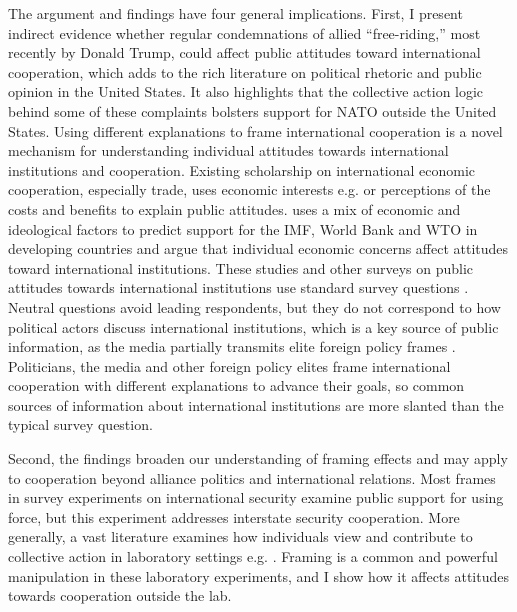 \documentclass[12pt]{article}
\begin{document}
The argument and findings have four general implications.
First, I present indirect evidence whether regular condemnations of allied ``free-riding,'' most recently by Donald Trump, could affect public attitudes toward international cooperation, which adds to the rich literature on political rhetoric and public opinion in the United States. 
It also highlights that the collective action logic behind some of these complaints bolsters support for NATO outside the United States.  
Using different explanations to frame international cooperation is a novel mechanism for understanding individual attitudes towards international institutions and cooperation. 
Existing scholarship on international economic cooperation, especially trade, uses economic interests e.g. \citep{Rogowski1987, MaydaRodrik2005} or perceptions of the costs and benefits \citep{Hainmueller2006, MansfieldMutz2009, RhoTomz2017} to explain public attitudes. 
\citet{Edwards2009} uses a mix of economic and ideological factors to predict support for the IMF, World Bank and WTO in developing countries and \citet{BearceScott2019} argue that individual economic concerns affect attitudes toward international institutions. 
These studies and other surveys on public attitudes towards international institutions use standard survey questions \citep{KayaWalker2014, DellmuthTallberg2015}.
Neutral questions avoid leading respondents, but they do not correspond to how political actors discuss international institutions, which is a key source of public information, as the media partially transmits elite foreign policy frames \citep{BaumPotter2008}. 
Politicians, the media and other foreign policy elites frame international cooperation with different explanations to advance their goals, so common sources of information about international institutions are more slanted than the typical survey question.  


Second, the findings broaden our understanding of framing effects and may apply to cooperation beyond alliance politics and international relations.  
Most frames in survey experiments on international security examine public support for using force, but this experiment addresses interstate security cooperation. 
More generally, a vast literature examines how individuals view and contribute to collective action in laboratory settings e.g. \citep{Ostrometal1992, GachterFehr1999, Houseretal2008, Aimoneetal2013}. 
Framing is a common and powerful manipulation in these laboratory experiments, and I show how it affects attitudes towards cooperation outside the lab. 
\end{document}
